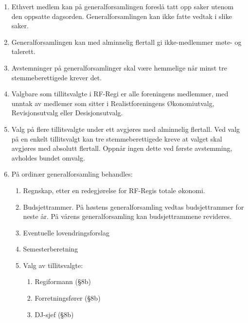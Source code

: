 \documentclass[a4paper,11pt,norsk]{scrartcl}
\begin{document}
\begin{enumerate}
\item Ethvert medlem kan på generalforsamlingen foreslå tatt opp saker
utenom den oppsatte dagsorden. Generalforsamlingen kan ikke fatte
vedtak i slike saker.

\item Generalforsamlingen kan med alminnelig flertall gi ikke-medlemmer
møte- og talerett.

\item Avstemninger på generalforsamlinger skal være hemmelige når minst
tre stemmeberettigede krever det.

\item Valgbare som tillitsvalgte i RF-Regi er alle foreningens medlemmer,
med unntak av medlemer som sitter i Realistforeningens Økonomiutvalg,
Revisjonsutvalg eller Desisjonsutvalg.

\item Valg på flere tillitsvalgte under ett avgjøres med alminnelig
flertall. Ved valg på en enkelt tillitsvalgt kan tre
stemmeberettigede kreve at valget skal avgjøres med absolutt
flertall. Oppnår ingen dette ved første avstemming, avholdes bundet
omvalg.

\item På ordinær generalforsamling behandles:

\begin{enumerate}
\renewcommand{\labelenumii}{\arabic{enumii}.}
\item Regnskap, etter en redegjørelse for RF-Regis totale økonomi.

\item Budsjettrammer. På høstens generalforsamling vedtas
budsjettrammer for neste år. På vårens generalforsamling kan
budsjettrammene revideres.

\item Eventuelle lovendringsforslag

\item Semesterberetning

\item Valg av tillitsvalgte:

\begin{enumerate}
\renewcommand{\labelenumiii}{\arabic{enumiii})}
\item Regiformann (§8b)

\item Forretningsfører (§8b)

\item DJ-sjef (§8b)
\end{enumerate}
\end{enumerate}
\end{enumerate}
\end{document}
